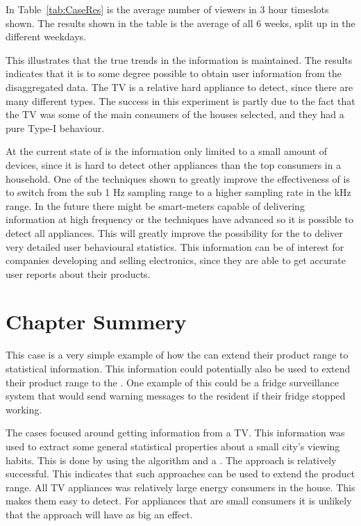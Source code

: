 In Table~\ref{tab:CaseRes} is the average number of viewers in 3 hour timeslots shown. The results shown in the table is the average of all 6 weeks, split up in the different weekdays. 



This illustrates that the true trends in the information is maintained. The results indicates that it is to some degree possible to obtain user information from the disaggregated data. The TV is a relative hard appliance to detect, since there are many different types. The success in this experiment is partly due to the fact that the TV was some of the main consumers of the houses selected, and they had a pure Type-I behaviour.

At the current state of  is the information only limited to a small amount of devices, since it is hard to detect other appliances than the top consumers in a household. One of the techniques shown to greatly improve the effectiveness of  is to switch from the sub 1 Hz sampling range to a higher sampling rate in the kHz range. In the future there might be smart-meters capable of delivering information at high frequency or the  techniques have advanced so it is possible to detect all appliances. This will greatly improve the possibility for the  to deliver very detailed user behavioural statistics. This information can be of interest for companies developing and selling electronics, since they are able to get accurate user reports about their products. 

\section{Chapter Summery}
This case is a very simple example of how the  can extend their product range to statistical information. This information could potentially also be used to extend their product range to the . One example of this could be a fridge surveillance system that would send warning messages to the resident if their fridge stopped working.

The cases focused around getting information from a TV. This information was used to extract some general statistical properties about a small city's viewing habits. This is done by using the  algorithm and a . The approach is relatively successful. This indicates that such approaches can be used to extend the  product range. All TV appliances was relatively large energy consumers in the house. This makes them easy to detect. For appliances that are small consumers it is unlikely that the approach will have as big an effect. 


